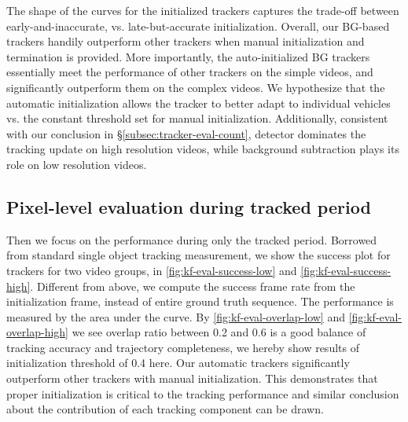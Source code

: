 

The shape of the curves for the initialized trackers captures the trade-off between early-and-inaccurate, vs. late-but-accurate initialization. Overall, our BG-based trackers handily outperform other trackers when manual initialization and termination is provided. More importantly, the auto-initialized BG trackers essentially meet the performance of other trackers on the simple videos, and significantly outperform them on the complex videos. We hypothesize that the automatic initialization allows the tracker to better adapt to individual vehicles vs. the constant threshold set for manual initialization. Additionally, consistent with our conclusion in \S\ref{subsec:tracker-eval-count}, detector dominates the tracking update on high resolution videos, while background subtraction plays its role on low resolution videos.

\subsection{Pixel-level evaluation during tracked period} 
\label{subsec:tracker-eval-acc}

Then we focus on the performance during only the tracked period. Borrowed from standard single object tracking measurement, we show the success plot for trackers for two video groups, in \ref{fig:kf-eval-success-low} and \ref{fig:kf-eval-success-high}. Different from above, we compute the success frame rate from the initialization frame, instead of entire ground truth sequence. The performance is measured by the area under the curve. By \ref{fig:kf-eval-overlap-low} and \ref{fig:kf-eval-overlap-high} we see overlap ratio between 0.2 and 0.6 is a good balance of tracking accuracy and trajectory completeness, we hereby show results of initialization threshold of 0.4 here.
Our automatic trackers significantly outperform other trackers with manual initialization. This demonstrates that proper initialization is critical to the tracking performance and similar conclusion about the contribution of each tracking component can be drawn.




